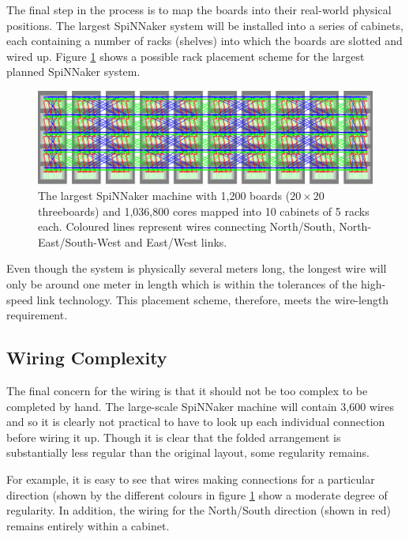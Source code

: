 			\label{sec:mapping-spinnaker-to-cabinets}
			
			The final step in the process is to map the boards into their real-world
			physical positions. The largest SpiNNaker system will be installed into a
			series of cabinets, each containing a number of racks (shelves) into which
			the boards are slotted and wired up. Figure \ref{fig:spinnaker106} shows a
			possible rack placement scheme for the largest planned SpiNNaker system.
			
			\begin{figure}
				\center
				\includegraphics[width=\textwidth]{figures/spinnaker106}
				\caption[SpiNNaker machine mapped into cabinets and racks.]{The largest
				SpiNNaker machine with 1,200 boards ($20\times20$ threeboards) and
				1,036,800 cores mapped into 10 cabinets of 5 racks each.  Coloured lines
				represent wires connecting {\color{red}North/South},
				{\color{green}North-East/South-West} and {\color{blue}East/West} links.}
				\label{fig:spinnaker106}
			\end{figure}
			
			Even though the system is physically several meters long, the longest wire
			will only be around one meter in length which is within the tolerances of
			the high-speed link technology. This placement scheme, therefore, meets the
			wire-length requirement.
			
		\subsection{Wiring Complexity}
			
			The final concern for the wiring is that it should not be too complex to
			be completed by hand. The large-scale SpiNNaker machine will contain 3,600
			wires and so it is clearly not practical to have to look up each
			individual connection before wiring it up. Though it is clear that the
			folded arrangement is substantially less regular than the original layout,
			some regularity remains.
			
			For example, it is easy to see that wires making connections for a
			particular direction (shown by the different colours in figure
			\ref{fig:spinnaker106} show a moderate degree of regularity. In addition,
			the wiring for the North/South direction (shown in red) remains entirely
			within a cabinet.
			
